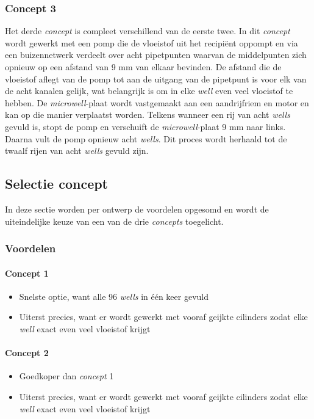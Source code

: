 \documentclass{article}
\begin{document}
{{\subsubsection{Concept 3}
Het derde \textit{concept} is compleet verschillend van de eerste twee. In dit \textit{concept} wordt gewerkt met een pomp die de vloeistof uit het recipiënt oppompt en via een buizennetwerk verdeelt over acht pipetpunten waarvan de middelpunten zich opnieuw op een afstand van 9 mm van elkaar bevinden. De afstand die de vloeistof aflegt van de pomp tot aan de uitgang van de pipetpunt is voor elk van de acht kanalen gelijk, wat belangrijk is om in elke \textit{well} even veel vloeistof te hebben. De \textit{microwell}-plaat wordt vastgemaakt aan een aandrijfriem en motor en kan op die manier verplaatst worden. Telkens wanneer een rij van acht \textit{wells} gevuld is, stopt de pomp en verschuift de \textit{microwell}-plaat 9 mm naar links. Daarna vult de pomp opnieuw acht \textit{wells}. Dit proces wordt herhaald tot de twaalf rijen van acht \textit{wells} gevuld zijn. 

\subsection{Selectie concept}
In deze sectie worden per ontwerp de voordelen opgesomd en wordt de uiteindelijke keuze van een van de drie \textit{concepts} toegelicht.

\subsubsection{Voordelen}

\paragraph{Concept 1}
	\begin{itemize}
		\item Snelste optie, want alle 96 \textit{wells} in één keer gevuld
		\item Uiterst precies, want er wordt gewerkt met vooraf geijkte cilinders zodat elke 	\textit{well} exact even veel vloeistof krijgt
	\end{itemize}

\paragraph{Concept 2}
	\begin{itemize}
		\item Goedkoper dan \textit{concept} 1
		\item Uiterst precies, want er wordt gewerkt met vooraf geijkte cilinders zodat elke 	\textit{well} exact even veel vloeistof krijgt
	\end{itemize}

}}
\end{document}

